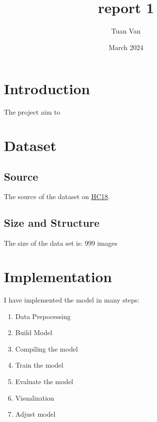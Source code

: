 \documentclass{article}
\title{report 1}
\author{Tuan Van}
\date{March 2024}
\begin{document}
\maketitle

\section{Introduction}
The project aim to 

\section{Dataset}
\subsection{Source}
The source of the dataset on \href{https://zenodo.org/records/1327317}{HC18}.
\subsection{Size and Structure}
The size of the data set is:
999 images 
\section{Implementation}
I have implemented the model in many steps:
\begin{enumerate}
\item Data Prepocessing
\item Build Model
\item Compiling the model
\item Train the model
\item Evaluate the model
\item Visualization
\item Adjust model
\end{enumerate}
\end{document}

